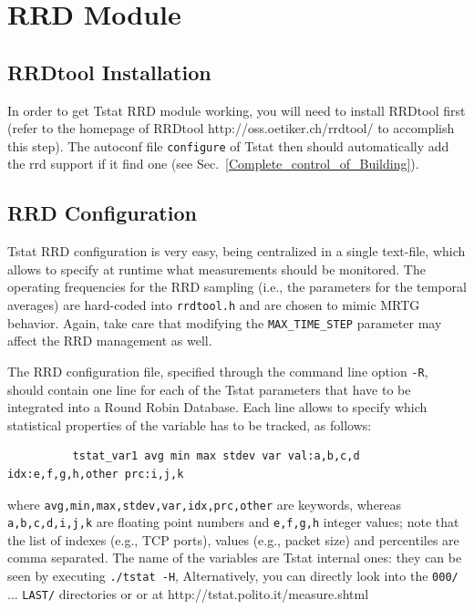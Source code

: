 \documentclass[11pt]{article}
\begin{document}
\section{RRD Module\label{RRD_Module}}
\subsection{RRDtool Installation\label{RRDtool_Installation}}


In order to get Tstat RRD module working, you will need to install RRDtool first
(refer to the homepage of RRDtool \textsf{http://oss.oetiker.ch/rrdtool/}  to accomplish this step).
The autoconf file \texttt{configure} of Tstat then should automatically add the rrd support 
if it find one (see Sec.~\ref{Complete_control_of_Building}).

\subsection{RRD Configuration\label{RRD_Configuration}}


Tstat RRD configuration is very easy, being centralized
in a single text-file, which allows to specify at runtime what measurements
should be monitored. The operating frequencies
for the RRD sampling (i.e., the parameters for the temporal 
averages) are hard-coded into \texttt{rrdtool.h} and are chosen to 
mimic MRTG behavior. Again, take care that modifying the \texttt{MAX\_TIME\_STEP}
parameter may affect the RRD management as well.



The RRD configuration file, specified through the command line option \texttt{-R},
should contain one line for each of the Tstat parameters that have
to be integrated into a Round Robin Database. Each line allows to
specify which statistical properties of the variable has to be tracked,
as follows:

\begin{small}\begin{verbatim}
          tstat_var1 avg min max stdev var val:a,b,c,d idx:e,f,g,h,other prc:i,j,k
\end{verbatim}\end{small} \noindent
where \texttt{avg,min,max,stdev,var,idx,prc,other} are keywords, whereas \texttt{a,b,c,d,i,j,k} 
are floating point numbers and \texttt{e,f,g,h} integer values; note that
the list of indexes (e.g., TCP ports), values (e.g., packet size)
and percentiles are comma separated. The name of the variables are
Tstat internal ones: they can be seen by executing \texttt{./tstat -H},
Alternatively, you can directly look into the \texttt{000/} ...  \texttt{LAST/}  directories or
or at \textsf{http://tstat.polito.it/measure.shtml}
\end{document}
